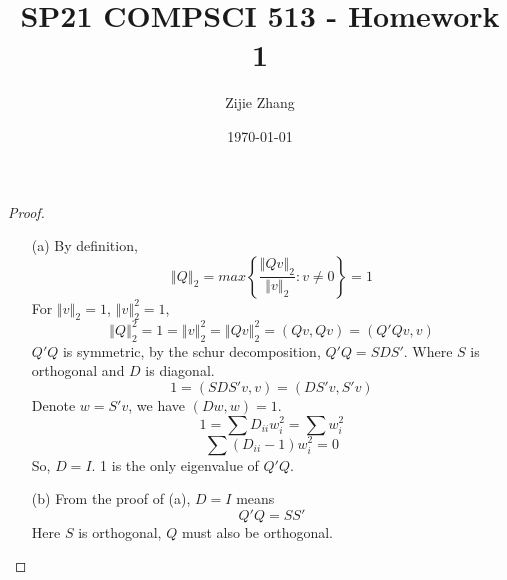 \documentclass{article}
\title{SP21 COMPSCI 513 - Homework 1}
\author{Zijie Zhang}
\date\today
\begin{document}
\maketitle

\begin{proof}
    \indent
    \begin{itemize}
        \item[(a)]
            By definition,
            $$\left\Vert Q \right\Vert_2 = max\left\{\frac{\left\Vert Qv \right\Vert_2}{\left\Vert v \right\Vert_2}:v\not=0\right\} = 1$$
            For $\left\Vert v \right\Vert_2 = 1$, $\left\Vert v \right\Vert_2^2 = 1$,
            $$\left\Vert Q \right\Vert_2^2 = 1 = \left\Vert v \right\Vert_2^2 = \left\Vert Qv \right\Vert_2^2 = (Qv, Qv) = (Q'Qv, v)$$
            $Q'Q$ is symmetric, by the schur decomposition, $Q'Q = SDS'$. Where $S$ is orthogonal and $D$ is diagonal.
            $$1 = (SDS'v, v) = (DS'v, S'v)$$
            Denote $w = S'v$, we have $(Dw, w) = 1$.
            $$1 = \sum D_{ii} w_i^2 = \sum w_i^2$$
            $$\sum \left(D_{ii} - 1\right)w_i^2 = 0$$
            So, $D = I$.
            1 is the only eigenvalue of $Q'Q$.
        \item[(b)] 
            From the proof of (a), $D = I$ means $$Q'Q = SS'$$
            Here $S$ is orthogonal, $Q$ must also be orthogonal.
    \end{itemize}
\end{proof}
\end{document}
